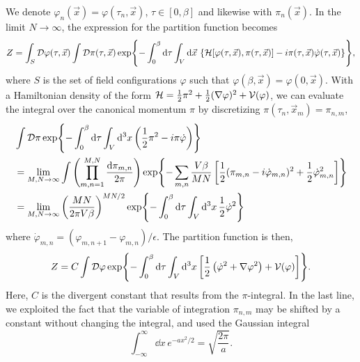 We denote $\varphi_n(\vec x) = \varphi(\tau_n, \vec x) $, $\tau \in [0, \beta]$ and likewise with $\pi_n(\vec x)$. 
In the limit $N \rightarrow \infty$, the expression for the partition function becomes
\begin{align}
    \label{Thermal partition function}
    Z = \int_S \mathcal{D} \varphi(\tau, \vec x)
    \int \mathcal{D} \pi(\tau, \vec x)
    \exp{
        - \int_0^\beta \dd \tau \int_V \dd \vec x \, 
        \left\{
            \mathcal{H}[\varphi(\tau, \vec x), \pi(\tau, \vec x)]
            - i \pi(\tau, \vec x) \dot \varphi(\tau, \vec x)
        \right\}
        },
\end{align}
where $S$ is the set of field configurations $\varphi$ such that  $\varphi(\beta, \vec x) = \varphi(0, \vec x)$.
With a Hamiltonian density of the form $\mathcal{H} = \frac{1}{2} \pi^2 + \frac{1}{2} (\nabla \varphi)^2 + \mathcal{V}(\varphi)$, we can evaluate the integral over the canonical momentum $\pi$ by discretizing $\pi(\tau_n, \vec x_m) = \pi_{n,m}$,
\begin{align*}
    & \int \mathcal{D} \pi \exp{-  \int_0^\beta\dd \tau \int_V \dd^3x 
    \left(
        \frac{1}{2} \pi^2 - i \pi \dot \varphi 
    \right)} \\
    & = \lim_{M,N \rightarrow \infty} \int \left(\prod_{m, n = 1}^{M, N} \frac{\dd \pi_{m, n}}{2 \pi}\right)
    \exp{
        - \sum_{m, n} \frac{V\beta}{MN}
        \left[
            \frac{1}{2}  (\pi_{m, n} - i \dot \varphi_{m, n})^2
            + \frac{1}{2} \dot \varphi_{m, n}^2
        \right]
    } \\
    & = \lim_{M,N \rightarrow \infty} \left( \frac{M N }{2 \pi V \beta} \right)^{MN/2}
    \exp{- \int_0^\beta\dd \tau \int_V \dd^3x \, \frac{1}{2}\dot \varphi^2}
\end{align*}
where $\dot \varphi_{m, n} = (\varphi_{m, n+1} - \varphi_{m, n})/\epsilon$.
The partition function is then, 
\begin{equation}
    Z = C \int \mathcal{D} \varphi
    \exp{
        - \int_0^\beta \dd \tau \int_V \dd^3 x
        \left[
            \frac{1}{2} \left(\dot \varphi^2 + \nabla \varphi^2\right) 
            + \mathcal{V}(\varphi)
        \right]
    }.
\end{equation}
Here, $C$ is the divergent constant that results from the $\pi$-integral.
In the last line, we exploited the fact that the variable of integration $\pi_{n,m}$ may be shifted by a constant without changing the integral, and used the Gaussian integral
\begin{equation*}
    \int_{-\infty}^{\infty} \dd x \, e^{-a x^2/2} = \sqrt{\frac{2 \pi}{a}}.
\end{equation*}
